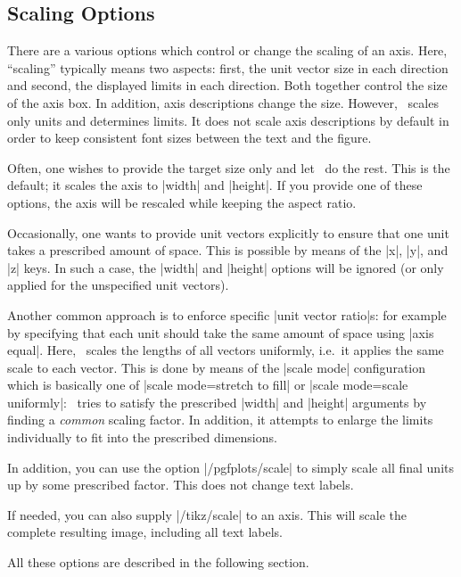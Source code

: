 
\subsection{Scaling Options}
There are a various options which control or change the scaling of an axis. Here, ``scaling'' typically means two aspects: first, the unit vector size in each direction and second, the displayed limits in each direction. Both together control the size of the axis box. In addition, axis descriptions change the size. However, \PGFPlots\ scales only units and determines limits. It does not scale axis descriptions by default in order to keep consistent font sizes between the text and the figure.

Often, one wishes to provide the target size only and let \PGFPlots\ do the rest. This is the default; it scales the axis to |width| and |height|. If you provide one of these options, the axis will be rescaled while keeping the aspect ratio. 

Occasionally, one wants to provide unit vectors explicitly to ensure that one unit takes a prescribed amount of space. This is possible by means of the |x|, |y|, and |z| keys. In such a case, the |width| and |height| options will be ignored (or only applied for the unspecified unit vectors).

Another common approach is to enforce specific |unit vector ratio|s: for example by specifying that each unit should take the same amount of space using |axis equal|. Here, \PGFPlots\ scales the lengths of all vectors uniformly, i.e.\ it applies the same scale to each vector. This is done by means of the |scale mode| configuration which is basically one of |scale mode=stretch to fill| or |scale mode=scale uniformly|: \PGFPlots\ tries to satisfy the prescribed |width| and |height| arguments by finding a \emph{common} scaling factor. In addition, it attempts to enlarge the limits individually to fit into the prescribed dimensions.

In addition, you can use the option |/pgfplots/scale| to simply scale all final units up by some prescribed factor. This does not change text labels. 

If needed, you can also supply |/tikz/scale| to an axis. This will scale the complete resulting image, including all text labels.

All these options are described in the following section.

